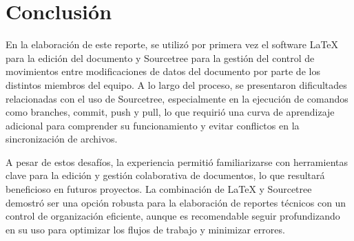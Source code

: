 \section{Conclusión}
En la elaboración de este reporte, se utilizó por primera vez el software LaTeX para la edición del documento y Sourcetree para la gestión del control de movimientos entre modificaciones de datos del documento por parte de los distintos miembros del equipo. A lo largo del proceso, se presentaron dificultades relacionadas con el uso de Sourcetree, especialmente en la ejecución de comandos como branches, commit, push y pull, lo que requirió una curva de aprendizaje adicional para comprender su funcionamiento y evitar conflictos en la sincronización de archivos.

A pesar de estos desafíos, la experiencia permitió familiarizarse con herramientas clave para la edición y gestión colaborativa de documentos, lo que resultará beneficioso en futuros proyectos. La combinación de LaTeX y Sourcetree demostró ser una opción robusta para la elaboración de reportes técnicos con un control de organización eficiente, aunque es recomendable seguir profundizando en su uso para optimizar los flujos de trabajo y minimizar errores.